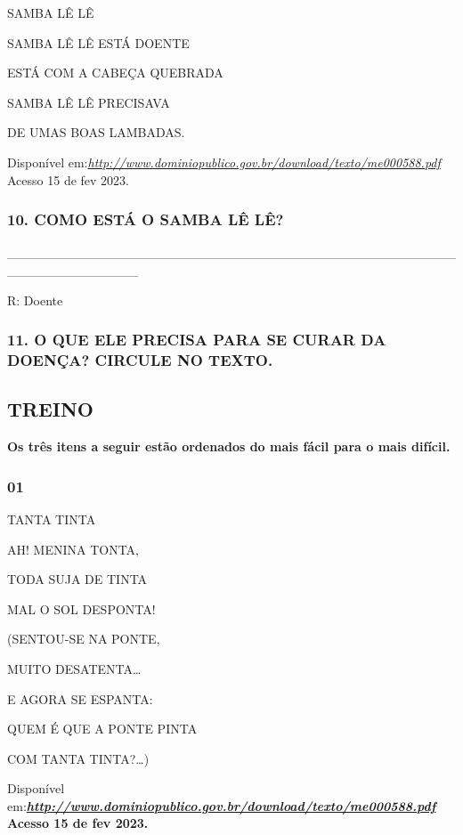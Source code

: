 SAMBA LÊ LÊ

SAMBA LÊ LÊ ESTÁ DOENTE

ESTÁ COM A CABEÇA QUEBRADA

SAMBA LÊ LÊ PRECISAVA

DE UMAS BOAS LAMBADAS.

Disponível
em:\href{http://www.dominiopublico.gov.br/download/texto/me000588.pdf}{\emph{http://www.dominiopublico.gov.br/download/texto/me000588.pdf}}
Acesso 15 de fev 2023.

\subsubsection{10. COMO ESTÁ O SAMBA LÊ
LÊ?}\label{como-estuxe1-o-samba-luxea-luxea}

\_\_\_\_\_\_\_\_\_\_\_\_\_\_\_\_\_\_\_\_\_\_\_\_\_\_\_\_\_\_\_\_\_\_\_\_\_\_\_\_\_\_\_\_\_\_\_\_\_\_\_\_\_\_\_\_\_\_\_\_\_\_

R: Doente

\subsubsection{11. O QUE ELE PRECISA PARA SE CURAR DA DOENÇA? CIRCULE NO
TEXTO.}\label{o-que-ele-precisa-para-se-curar-da-doenuxe7a-circule-no-texto.}

\subsection{TREINO}\label{treino-5}

\textbf{Os três itens a seguir estão ordenados do mais fácil para o mais
difícil. }

\subsubsection{01}\label{section-20}

TANTA TINTA

AH! MENINA TONTA,

TODA SUJA DE TINTA

MAL O SOL DESPONTA!

(SENTOU-SE NA PONTE,

MUITO DESATENTA\ldots{}

E AGORA SE ESPANTA:

QUEM É QUE A PONTE PINTA

COM TANTA TINTA?\ldots{})

Disponível
em:\textbf{\href{http://www.dominiopublico.gov.br/download/texto/me000588.pdf}{\emph{http://www.dominiopublico.gov.br/download/texto/me000588.pdf}}
Acesso 15 de fev 2023.}

